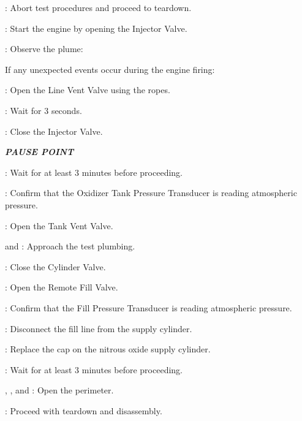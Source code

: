 \begin{checklist}
\begin{checklist}
\begin{checklist}[label=$\bullet$]
\begin{checklist}
                \item \ops: Abort test procedures and proceed to teardown.
            \end{checklist}
        \end{checklist}
        \item \primary: Start the engine by opening the Injector Valve.
    \end{checklist}
    \item \primary: Observe the plume:
    \begin{checklist}[label=$\bullet$]
        \item If any unexpected events occur during the engine firing:
        \begin{checklist}
            \item \primary{}: Open the Line Vent Valve using the ropes.
            \item \primary{}: Wait for 3 seconds.
            \item \primary{}: Close the Injector Valve.
        \end{checklist}
    \end{checklist}
    \item \textbf{\textit{PAUSE POINT}}
    \item \ops{}: Wait for at least 3 minutes before proceeding.
    \item \daq{}: Confirm that the Oxidizer Tank Pressure Transducer is reading atmospheric pressure.
    \item \primary{}: Open the Tank Vent Valve.
    \item \primary{} and \secondary: Approach the test plumbing.
    \item \primary{}: Close the Cylinder Valve.
    \item \primary{}: Open the Remote Fill Valve.
    \item \daq{}: Confirm that the Fill Pressure Transducer is reading atmospheric pressure.
    \item \primary{}: Disconnect the fill line from the supply cylinder.
    \item \primary{}: Replace the cap on the nitrous oxide supply cylinder.
    \item \ops{}: Wait for at least 3 minutes before proceeding.
    \item \peri{}, \perii{}, and \periii{}: Open the perimeter.
    \item \ops{}: Proceed with teardown and disassembly.

\end{checklist}
\setcounter{checklistnum}{0}

